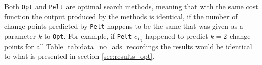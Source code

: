 Both \texttt{Opt} and \texttt{Pelt} are optimal search methods, meaning that with the same cost function the output produced by the methods is identical, if the number of change points predicted by \texttt{Pelt} happens to be the same that was given as a parameter $k$ to \texttt{Opt}. For example, if \texttt{Pelt} $c_{L_2}$ happened to predict $k=2$ change points for all Table \ref{tab:data_no_ads} recordings the results would be identical to what is presented in section \ref{sec:results_opt}.

